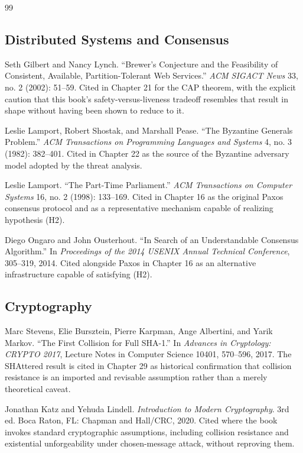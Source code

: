 \documentclass[11pt,openany]{book}
\begin{document}
\begin{thebibliography}{99}

\subsection*{Distributed Systems and Consensus}

Seth Gilbert and Nancy Lynch.
``Brewer's Conjecture and the Feasibility of Consistent, Available,
Partition-Tolerant Web Services.''
\emph{ACM SIGACT News} 33, no. 2 (2002): 51--59.
Cited in Chapter 21 for the CAP theorem, with the explicit caution that this
book's safety-versus-liveness tradeoff resembles that result in shape without
having been shown to reduce to it.

Leslie Lamport, Robert Shostak, and Marshall Pease.
``The Byzantine Generals Problem.''
\emph{ACM Transactions on Programming Languages and Systems} 4, no. 3
(1982): 382--401.
Cited in Chapter 22 as the source of the Byzantine adversary model adopted by
the threat analysis.

Leslie Lamport.
``The Part-Time Parliament.''
\emph{ACM Transactions on Computer Systems} 16, no. 2 (1998): 133--169.
Cited in Chapter 16 as the original Paxos consensus protocol and as a
representative mechanism capable of realizing hypothesis (H2).

Diego Ongaro and John Ousterhout.
``In Search of an Understandable Consensus Algorithm.''
In \emph{Proceedings of the 2014 USENIX Annual Technical Conference},
305--319, 2014.
Cited alongside Paxos in Chapter 16 as an alternative infrastructure capable
of satisfying (H2).

\subsection*{Cryptography}

Marc Stevens, Elie Bursztein, Pierre Karpman, Ange Albertini, and Yarik Markov.
``The First Collision for Full SHA-1.''
In \emph{Advances in Cryptology: CRYPTO 2017}, Lecture Notes in Computer
Science 10401, 570--596, 2017.
The SHAttered result is cited in Chapter 29 as historical confirmation that
collision resistance is an imported and revisable assumption rather than a
merely theoretical caveat.

Jonathan Katz and Yehuda Lindell.
\emph{Introduction to Modern Cryptography}. 3rd ed.
Boca Raton, FL: Chapman and Hall/CRC, 2020.
Cited where the book invokes standard cryptographic assumptions, including
collision resistance and existential unforgeability under chosen-message
attack, without reproving them.


\end{thebibliography}
\end{document}
